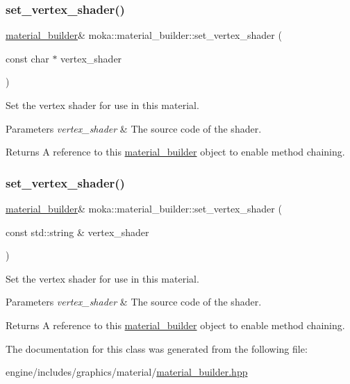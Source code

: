 \subsubsection{\texorpdfstring{set\_vertex\_shader()}{set\_vertex\_shader()}\hspace{0.1cm}{\footnotesize\ttfamily [2/3]}}
{\footnotesize\ttfamily \mbox{\hyperlink{classmoka_1_1material__builder}{material\+\_\+builder}}\& moka\+::material\+\_\+builder\+::set\+\_\+vertex\+\_\+shader (\begin{DoxyParamCaption}\item[{const char $\ast$}]{vertex\+\_\+shader }\end{DoxyParamCaption})}



Set the vertex shader for use in this material. 


\begin{DoxyParams}{Parameters}
{\em vertex\+\_\+shader} & The source code of the shader. \\
\hline
\end{DoxyParams}
\begin{DoxyReturn}{Returns}
A reference to this \mbox{\hyperlink{classmoka_1_1material__builder}{material\+\_\+builder}} object to enable method chaining. 
\end{DoxyReturn}
\mbox{\label{classmoka_1_1material__builder_a491153eb2c594163916f5eaeb1fffb70}} 
\subsubsection{\texorpdfstring{set\_vertex\_shader()}{set\_vertex\_shader()}\hspace{0.1cm}{\footnotesize\ttfamily [3/3]}}
{\footnotesize\ttfamily \mbox{\hyperlink{classmoka_1_1material__builder}{material\+\_\+builder}}\& moka\+::material\+\_\+builder\+::set\+\_\+vertex\+\_\+shader (\begin{DoxyParamCaption}\item[{const std\+::string \&}]{vertex\+\_\+shader }\end{DoxyParamCaption})}



Set the vertex shader for use in this material. 


\begin{DoxyParams}{Parameters}
{\em vertex\+\_\+shader} & The source code of the shader. \\
\hline
\end{DoxyParams}
\begin{DoxyReturn}{Returns}
A reference to this \mbox{\hyperlink{classmoka_1_1material__builder}{material\+\_\+builder}} object to enable method chaining. 
\end{DoxyReturn}


The documentation for this class was generated from the following file\+:\begin{DoxyCompactItemize}
\item 
engine/includes/graphics/material/\mbox{\hyperlink{material__builder_8hpp}{material\+\_\+builder.\+hpp}}\end{DoxyCompactItemize}
